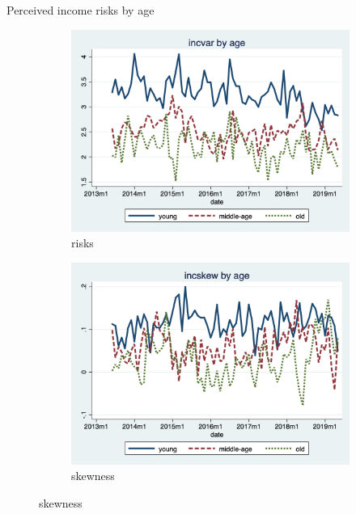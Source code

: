 \documentclass{beamer}
\begin{document}
\begin{frame}{Perceived income risks by age}
	\begin{figure}[ht]
		\label{ts_incvar_age_g_mean}
		\begin{subfigure}[b]{0.7\textwidth}
			\centering
			\caption{risks}
			\includegraphics[width=\textwidth, height = 0.33\textheight]{figures/ts_incvar_age_g_mean.png}
		\end{subfigure}
		\begin{subfigure}[b]{0.7\textwidth}
			\caption{skewness}
			\includegraphics[width=\textwidth, height = 0.33\textheight]{figures/ts_incskew_age_g_mean.png}
		\end{subfigure}
	\end{figure}
\end{frame}
\end{document}
